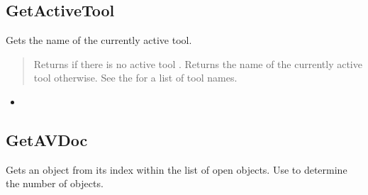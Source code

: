 \documentclass[letterpaper,12pt,english,openany,oneside]{sphinxmanual}
\begin{document}
\subsection{GetActiveTool}
\label{\detokenize{IAC_API_OLE_Objects:getactivetool}}
Gets the name of the currently active tool.


\begin{sphinxVerbatim}[commandchars=\\\{\}]
 
\end{sphinxVerbatim}

\begin{quote}

Returns  if there is no active tool . Returns the name of the currently active tool otherwise. See the  for a list of tool names.
\end{quote}
\label{\detokenize{IAC_API_OLE_Objects:related-methods-3}}
\begin{itemize}
\item {} 
 

\end{itemize}




\subsection{GetAVDoc}
\label{\detokenize{IAC_API_OLE_Objects:getavdoc}}
Gets an  object from its index within the list of open  objects. Use   to determine the number of  objects.


\begin{sphinxVerbatim}[commandchars=\\\{\}]
  
\end{sphinxVerbatim}

\end{document}
